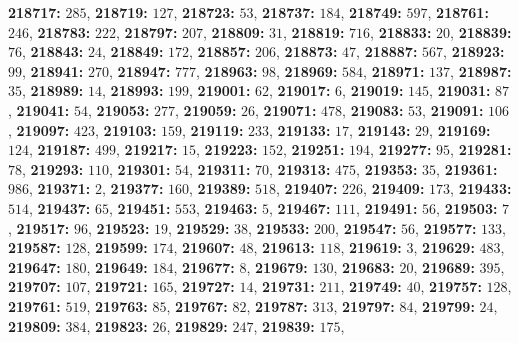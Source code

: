 \textsf{\bfseries 218717:} $285$, \textsf{\bfseries 218719:} $127$, \textsf{\bfseries 218723:} $53$, \textsf{\bfseries 218737:} $184$, \textsf{\bfseries 218749:} $597$, \textsf{\bfseries 218761:} $246$, \textsf{\bfseries 218783:} $222$, \textsf{\bfseries 218797:} $207$, \textsf{\bfseries 218809:} $31$, \textsf{\bfseries 218819:} $716$, \textsf{\bfseries 218833:} $20$, \textsf{\bfseries 218839:} $76$, \textsf{\bfseries 218843:} $24$, \textsf{\bfseries 218849:} $172$, \textsf{\bfseries 218857:} $206$, \textsf{\bfseries 218873:} $47$, \textsf{\bfseries 218887:} $567$, \textsf{\bfseries 218923:} $99$, \textsf{\bfseries 218941:} $270$, \textsf{\bfseries 218947:} $777$, \textsf{\bfseries 218963:} $98$, \textsf{\bfseries 218969:} $584$, \textsf{\bfseries 218971:} $137$, \textsf{\bfseries 218987:} $35$, \textsf{\bfseries 218989:} $14$, \textsf{\bfseries 218993:} $199$, \textsf{\bfseries 219001:} $62$, \textsf{\bfseries 219017:} $6$, \textsf{\bfseries 219019:} $145$, \textsf{\bfseries 219031:} $87$, \textsf{\bfseries 219041:} $54$, \textsf{\bfseries 219053:} $277$, \textsf{\bfseries 219059:} $26$, \textsf{\bfseries 219071:} $478$, \textsf{\bfseries 219083:} $53$, \textsf{\bfseries 219091:} $106$, \textsf{\bfseries 219097:} $423$, \textsf{\bfseries 219103:} $159$, \textsf{\bfseries 219119:} $233$, \textsf{\bfseries 219133:} $17$, \textsf{\bfseries 219143:} $29$, \textsf{\bfseries 219169:} $124$, \textsf{\bfseries 219187:} $499$, \textsf{\bfseries 219217:} $15$, \textsf{\bfseries 219223:} $152$, \textsf{\bfseries 219251:} $194$, \textsf{\bfseries 219277:} $95$, \textsf{\bfseries 219281:} $78$, \textsf{\bfseries 219293:} $110$, \textsf{\bfseries 219301:} $54$, \textsf{\bfseries 219311:} $70$, \textsf{\bfseries 219313:} $475$, \textsf{\bfseries 219353:} $35$, \textsf{\bfseries 219361:} $986$, \textsf{\bfseries 219371:} $2$, \textsf{\bfseries 219377:} $160$, \textsf{\bfseries 219389:} $518$, \textsf{\bfseries 219407:} $226$, \textsf{\bfseries 219409:} $173$, \textsf{\bfseries 219433:} $514$, \textsf{\bfseries 219437:} $65$, \textsf{\bfseries 219451:} $553$, \textsf{\bfseries 219463:} $5$, \textsf{\bfseries 219467:} $111$, \textsf{\bfseries 219491:} $56$, \textsf{\bfseries 219503:} $7$, \textsf{\bfseries 219517:} $96$, \textsf{\bfseries 219523:} $19$, \textsf{\bfseries 219529:} $38$, \textsf{\bfseries 219533:} $200$, \textsf{\bfseries 219547:} $56$, \textsf{\bfseries 219577:} $133$, \textsf{\bfseries 219587:} $128$, \textsf{\bfseries 219599:} $174$, \textsf{\bfseries 219607:} $48$, \textsf{\bfseries 219613:} $118$, \textsf{\bfseries 219619:} $3$, \textsf{\bfseries 219629:} $483$, \textsf{\bfseries 219647:} $180$, \textsf{\bfseries 219649:} $184$, \textsf{\bfseries 219677:} $8$, \textsf{\bfseries 219679:} $130$, \textsf{\bfseries 219683:} $20$, \textsf{\bfseries 219689:} $395$, \textsf{\bfseries 219707:} $107$, \textsf{\bfseries 219721:} $165$, \textsf{\bfseries 219727:} $14$, \textsf{\bfseries 219731:} $211$, \textsf{\bfseries 219749:} $40$, \textsf{\bfseries 219757:} $128$, \textsf{\bfseries 219761:} $519$, \textsf{\bfseries 219763:} $85$, \textsf{\bfseries 219767:} $82$, \textsf{\bfseries 219787:} $313$, \textsf{\bfseries 219797:} $84$, \textsf{\bfseries 219799:} $24$, \textsf{\bfseries 219809:} $384$, \textsf{\bfseries 219823:} $26$, \textsf{\bfseries 219829:} $247$, \textsf{\bfseries 219839:} $175$, 
